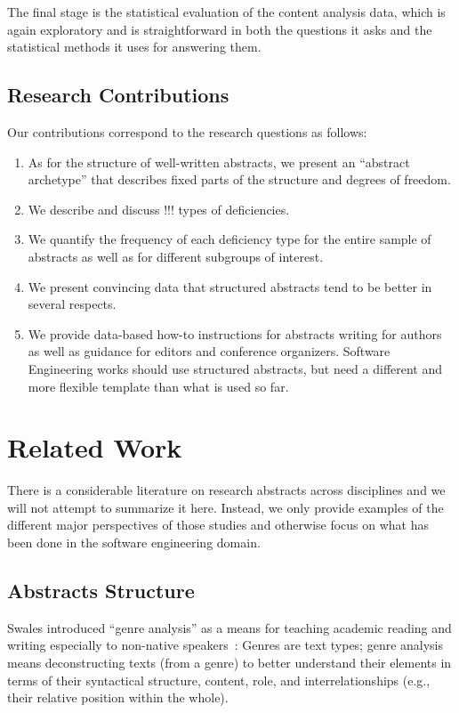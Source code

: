 \documentclass[10pt,journal,compsoc]{IEEEtran}
\begin{document}
The final stage is the statistical evaluation of the content analysis data,
which is again exploratory and is straightforward in both
the questions it asks and the statistical methods it uses for answering them.


\subsection{Research Contributions}

Our contributions correspond to the research questions as follows:
\begin{enumerate}
	\item As for the structure of well-written abstracts, we present an ``abstract archetype''
	  that describes fixed parts of the structure and degrees of freedom.
	\item We describe and discuss !!! types of deficiencies.
	\item We quantify the frequency of each deficiency type for the entire sample of abstracts
	  as well as for different subgroups of interest.
	\item We present convincing data that structured abstracts tend to be better
	  in several respects.
	\item We provide data-based how-to instructions for abstracts writing for authors
	  as well as guidance for editors and conference organizers.
	  Software Engineering works should use structured abstracts, but
	  need a different and more flexible template than what is used so far.
\end{enumerate}


\section{Related Work}

There is a considerable literature on research abstracts across disciplines
and we will not attempt to summarize it here.
Instead, we only provide examples of the different major perspectives of those studies
and otherwise focus on what has been done in the software engineering domain.


\subsection{Abstracts Structure}

Swales introduced ``genre analysis'' as a means for teaching academic reading and writing
especially to non-native speakers~\cite{Swales90}:
Genres are text types;
genre analysis means deconstructing texts (from a genre) to better understand
their elements in
terms of their syntactical structure, content, role, and interrelationships
(e.g., their relative position within the whole).
\end{document}

